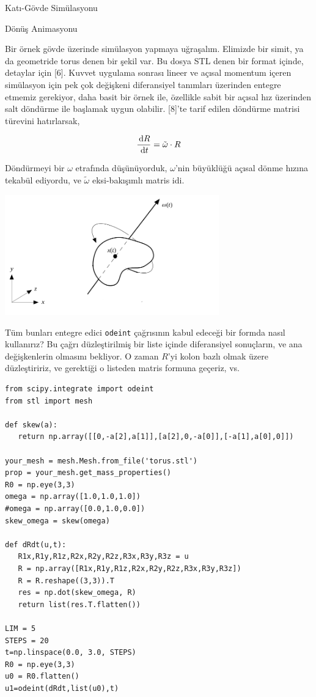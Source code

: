 \documentclass[12pt,fleqn]{article}\usepackage{../../common}
\begin{document}
Katı-Gövde Simülasyonu

Dönüş Animasyonu

Bir örnek gövde üzerinde simülasyon yapmaya uğraşalım. Elimizde bir simit, ya da
geometride torus denen bir şekil var. Bu dosya STL denen bir format içinde,
detaylar için [6]. Kuvvet uygulama sonrası lineer ve açısal momentum içeren
simülasyon için pek çok değişkeni diferansiyel tanımları üzerinden entegre
etmemiz gerekiyor, daha basit bir örnek ile, özellikle sabit bir açısal hız
üzerinden salt döndürme ile başlamak uygun olabilir. [8]'te tarif edilen
döndürme matrisi türevini hatırlarsak,

$$
\frac{\,\mathrm{d} R}{\,\mathrm{d} t} = \tilde \omega \cdot R
$$

Döndürmeyi bir $\omega$ etrafında düşünüyorduk, $\omega$'nin büyüklüğü
açısal dönme hızına tekabül ediyordu, ve $\tilde \omega$ eksi-bakışımlı
matris idi.

\includegraphics[width=25em]{compscieng_bpp32sim_rigbod_01.png}

Tüm bunları entegre edici \verb!odeint! çağrısının kabul edeceği bir formda
nasıl kullanırız? Bu çağrı düzleştirilmiş bir liste içinde diferansiyel
sonuçların, ve ana değişkenlerin olmasını bekliyor. O zaman $R$'yi kolon bazlı
olmak üzere düzleştiririz, ve gerektiği o listeden matris formuna geçeriz, vs.

\begin{verbatim}
from scipy.integrate import odeint
from stl import mesh

def skew(a):
   return np.array([[0,-a[2],a[1]],[a[2],0,-a[0]],[-a[1],a[0],0]])

your_mesh = mesh.Mesh.from_file('torus.stl')
prop = your_mesh.get_mass_properties()
R0 = np.eye(3,3)
omega = np.array([1.0,1.0,1.0])
#omega = np.array([0.0,1.0,0.0])
skew_omega = skew(omega)
   
def dRdt(u,t):   
   R1x,R1y,R1z,R2x,R2y,R2z,R3x,R3y,R3z = u
   R = np.array([R1x,R1y,R1z,R2x,R2y,R2z,R3x,R3y,R3z])
   R = R.reshape((3,3)).T
   res = np.dot(skew_omega, R)
   return list(res.T.flatten())

LIM = 5
STEPS = 20
t=np.linspace(0.0, 3.0, STEPS)
R0 = np.eye(3,3)
u0 = R0.flatten()
u1=odeint(dRdt,list(u0),t)
\end{verbatim}
\end{document}
